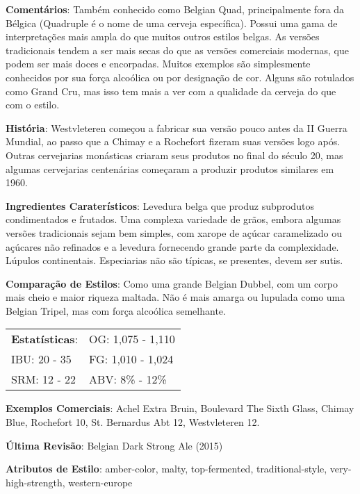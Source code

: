 \textbf{Comentários}: Também conhecido como Belgian Quad, principalmente fora da Bélgica (Quadruple é o nome de uma cerveja específica). Possui uma gama de interpretações mais ampla do que muitos outros estilos belgas. As versões tradicionais tendem a ser mais secas do que as versões comerciais modernas, que podem ser mais doces e encorpadas. Muitos exemplos são simplesmente conhecidos por sua força alcoólica ou por designação de cor. Alguns são rotulados como Grand Cru, mas isso tem mais a ver com a qualidade da cerveja do que com o estilo.

\textbf{História}: Westvleteren começou a fabricar sua versão pouco antes da II Guerra Mundial, ao passo que a Chimay e a Rochefort fizeram suas versões logo após. Outras cervejarias monásticas criaram seus produtos no final do século 20, mas algumas cervejarias centenárias começaram a produzir produtos similares em 1960.

\textbf{Ingredientes Caraterísticos}: Levedura belga que produz subprodutos condimentados e frutados. Uma complexa variedade de grãos, embora algumas versões tradicionais sejam bem simples, com xarope de açúcar caramelizado ou açúcares não refinados e a levedura fornecendo grande parte da complexidade. Lúpulos continentais. Especiarias não são típicas, se presentes, devem ser sutis.

\textbf{Comparação de Estilos}: Como uma grande Belgian Dubbel, com um corpo mais cheio e maior riqueza maltada. Não é mais amarga ou lupulada como uma Belgian Tripel, mas com força alcoólica semelhante.

\begin{tabular}{@{}p{35mm}p{35mm}@{}}
  \textbf{Estatísticas}: & OG: 1,075 - 1,110 \\
  IBU: 20 - 35  & FG: 1,010 - 1,024  \\
  SRM: 12 - 22  & ABV: 8\% - 12\%
\end{tabular}

\textbf{Exemplos Comerciais}: Achel Extra Bruin, Boulevard The Sixth Glass, Chimay Blue, Rochefort 10, St. Bernardus Abt 12, Westvleteren 12.

\textbf{Última Revisão}: Belgian Dark Strong Ale (2015)

\textbf{Atributos de Estilo}: amber-color, malty, top-fermented, traditional-style, very-high-strength, western-europe
